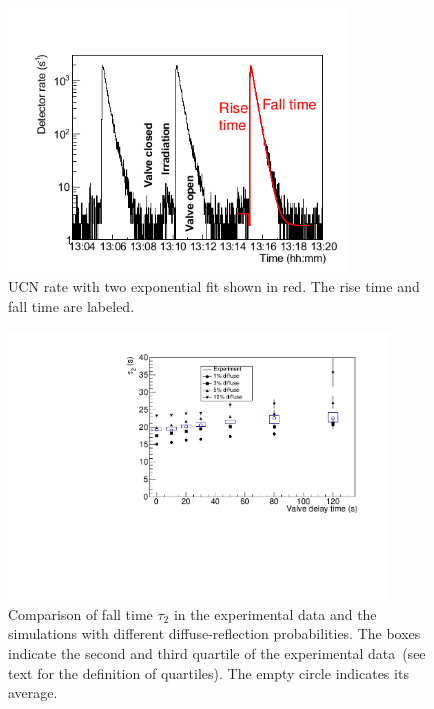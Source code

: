 \begin{figure}[h!]
  \centering
  \includegraphics[width=0.8\textwidth]{risefalltime.png}
  \caption{UCN rate with two exponential fit shown in red. The rise
    time and fall time are labeled.}
  \label{fig:risefalltime}
\end{figure}

	
\begin{figure}[h!]
  \centering \includegraphics[width=0.9\textwidth]{falltime.pdf}
  \caption{Comparison of fall time $\tau_2$ in the experimental data
    and the simulations with different diffuse-reflection
    probabilities. The boxes indicate the second and third quartile of
    the experimental data~(see text for the definition of quartiles).
    The empty circle indicates its average.}
\label{fig:falltime}
\end{figure}

